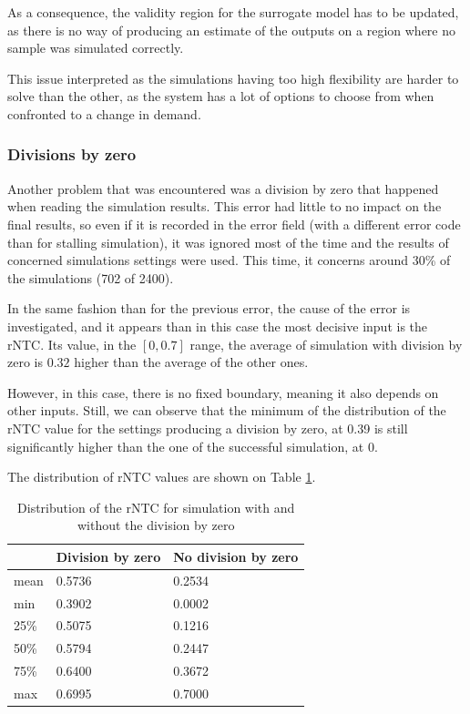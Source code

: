 As a consequence, the validity region for the surrogate model has to be updated, as there is no way of producing an estimate of the outputs on a region where no sample was simulated correctly.

This issue interpreted as the simulations having too high flexibility are harder to solve than the other, as the system has a lot of options to choose from when confronted to a change in demand.

\subsubsection{Divisions by zero}

Another problem that was encountered was a division by zero that happened when reading the simulation results. This error had little to no impact on the final results, so even if it is recorded in the error field (with a different error code than for stalling simulation), it was ignored most of the time and the results of concerned simulations settings were used. This time, it concerns around 30\% of the simulations (702 of 2400).

In the same fashion than for the previous error, the cause of the error is investigated, and it appears than in this case the most decisive input is the rNTC. Its value, in the $[0, 0.7]$ range, the average of simulation with division by zero is $0.32$ higher than the average of the other ones. 

However, in this case, there is no fixed boundary, meaning it also depends on other inputs. Still, we can observe that the minimum of the distribution of the rNTC value for the settings producing a division by zero, at 0.39 is still significantly higher than the one of the successful simulation, at 0. 

The distribution of rNTC values are shown on Table \ref{tab:divzero-simulations}.

\begin{table}
    \centering
    \begin{tabular}{|l|ll|}
        \hline
        & Division by zero & No division by zero \\ \hline
        mean & 0.5736 & 0.2534 \\
        min  & 0.3902 & 0.0002 \\
        25\% & 0.5075 & 0.1216 \\
        50\% & 0.5794 & 0.2447 \\
        75\% & 0.6400 & 0.3672 \\
        max  & 0.6995 & 0.7000 \\ \hline
    \end{tabular}
    \caption{Distribution of the rNTC for simulation with and without the division by zero}
    \label{tab:divzero-simulations}
\end{table}

